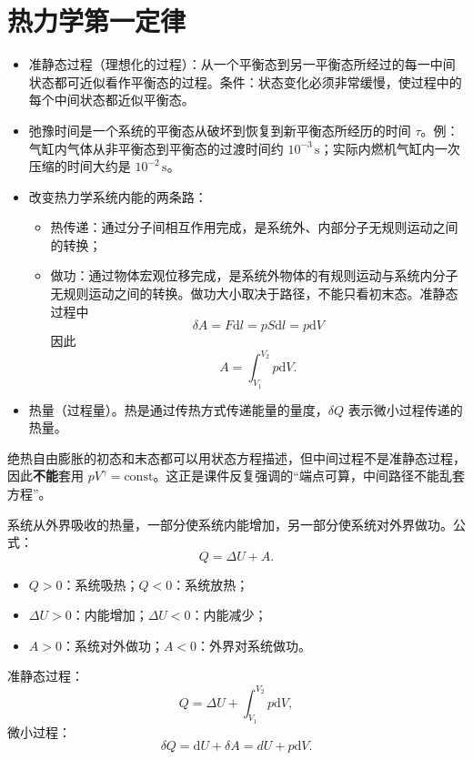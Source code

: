 \documentclass[lang=cn,11pt]{elegantbook}
\begin{document}
\chapter{热力学第一定律}

\begin{definition}
    \begin{itemize}
    \item 准静态过程（理想化的过程）：从一个平衡态到另一平衡态所经过的每一中间状态都可近似看作平衡态的过程。条件：状态变化必须非常缓慢，使过程中的每个中间状态都近似平衡态。
    \item 弛豫时间是一个系统的平衡态从破坏到恢复到新平衡态所经历的时间 \(\tau\)。例：气缸内气体从非平衡态到平衡态的过渡时间约 \(10^{-3}\,\text{s}\)；实际内燃机气缸内一次压缩的时间大约是 \(10^{-2}\,\text{s}\)。
    \item 改变热力学系统内能的两条路：
    \begin{itemize}
    \item 热传递：通过分子间相互作用完成，是系统外、内部分子无规则运动之间的转换；
    \item 做功：通过物体宏观位移完成，是系统外物体的有规则运动与系统内分子无规则运动之间的转换。做功大小取决于路径，不能只看初末态。准静态过程中\[\delta A = F\mathrm dl = pS\mathrm dl = p\mathrm dV\]因此\[A=\int_{V_1}^{V_2}p\mathrm dV.\]
    \end{itemize}
    \item 热量（过程量）。热是通过传热方式传递能量的量度，\(\delta Q\) 表示微小过程传递的热量。
    \end{itemize}
\end{definition}
绝热自由膨胀的初态和末态都可以用状态方程描述，但中间过程不是准静态过程，因此\textbf{不能}套用 \(pV^\gamma=\text{const}\)。这正是课件反复强调的“端点可算，中间路径不能乱套方程”。
\begin{theorem}[热力学第一定律]
系统从外界吸收的热量，一部分使系统内能增加，另一部分使系统对外界做功。公式：
\[
Q=\Delta U+A.
\]
\begin{itemize}
    \item \(Q>0\)：系统吸热；\(Q<0\)：系统放热；
    \item \(\Delta U>0\)：内能增加；\(\Delta U<0\)：内能减少；
    \item \(A>0\)：系统对外做功；\(A<0\)：外界对系统做功。
\end{itemize}
准静态过程：\[
Q=\Delta U+\int_{V_1}^{V_2}p\mathrm dV,
\]微小过程：\[
\delta Q=\mathrm dU+\delta A=dU+p\mathrm dV.
\]
\end{theorem}
\end{document}
